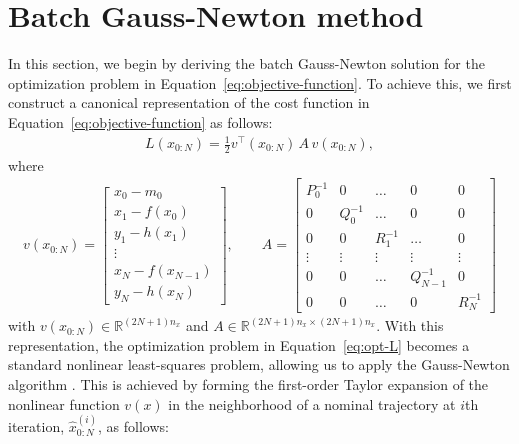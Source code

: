 \documentclass[dissertation,math,vertlayout,pdfa,colorlinks,nologo]{aaltoseries}
\begin{document}
\section{Batch Gauss-Newton method}
In this section, we begin by deriving the batch Gauss-Newton solution for the optimization problem in Equation~\eqref{eq:objective-function}. To achieve this, we first construct a canonical representation of the cost function in Equation~\eqref{eq:objective-function} \citep{bell1994iterated, sarkka2020levenberg} as follows:
\begin{equation} \label{eq:canonical-L}
    \begin{split}
        L(x_{0:N}) = \frac{1}{2} v^\top(x_{0:N}) \, A \, v(x_{0:N}), 
    \end{split}
\end{equation}
where 
\begin{equation} \label{eq:rx-A}
    \begin{split}
        v(x_{0:N}) = \begin{bmatrix}
            x_0 - m_0\\
            x_1 - f(x_0)\\
            y_1 - h(x_1)\\
            \vdots\\
            x_N - f(x_{N-1})\\
            y_N - h(x_N)
        \end{bmatrix}, \qquad A = \begin{bmatrix}
            P_0^{-1} & 0        & \ldots   & 0 & 0\\
            0        & Q_0^{-1} & \ldots   & 0 & 0\\
            0        & 0        & R_1^{-1} & \ldots & 0\\
            \vdots   & \vdots   & \vdots   & \vdots & \vdots\\
            0        & 0        & \ldots   & Q_{N-1}^{-1} & 0\\
            0        & 0        & \ldots   & 0 &  R_{N}^{-1}
        \end{bmatrix}
    \end{split}
\end{equation}
with $v(x_{0:N})\in \mathbb{R}^{(2N+1)n_x}$ and $A \in \mathbb{R}^{(2N+1)n_x \times (2N+1)n_x}$. With this representation, the optimization problem in Equation~\eqref{eq:opt-L} becomes a standard nonlinear least-squares problem, allowing us to apply the Gauss-Newton algorithm \citep[Chaps. 9 and 4 respectively]{bjorck1996numerical, boyd2004convex}. This is achieved by forming the first-order Taylor expansion of the nonlinear function $v(x)$ in the neighborhood of a nominal trajectory at $i$th iteration, $\hat{x}^{(i)}_{0:N}$, as follows:
\end{document}
